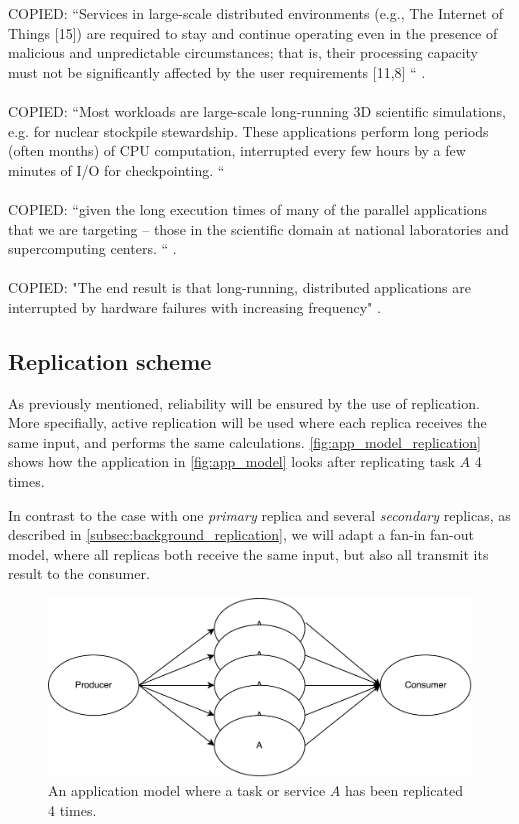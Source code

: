 \documentclass{cslthse-msc}
\begin{document}
COPIED:
“Services in large-scale distributed environments (e.g., The Internet of Things [15]) are required to stay and continue operating even in the presence of malicious and unpredictable circumstances; that is, their processing capacity must not be significantly affected by the user requirements [11,8] “ \cite{imprRelAdaptRL}.
\\\\
COPIED: “Most workloads are large-scale long-running 3D scientific simulations, e.g. for nuclear stockpile stewardship. These applications perform long periods (often months) of CPU computation, interrupted every few hours by a few minutes of I/O for checkpointing. “  \cite{studyOfFailures}
\\\\
COPIED: “given the long execution times of many of the parallel applications that we are targeting – those in the scientific domain at national laboratories and supercomputing centers. “  \cite{implicationsOfFailures}. 
\\\\
COPIED: "The end result is that long-running, distributed applications are interrupted by hardware failures with increasing frequency"  \cite{surveyFaultParallel}.

\fi

\subsection{Replication scheme} \label{subsec:design_repl_scheme}
As previously mentioned, reliability will be ensured by the use of replication. More specifially, active replication will be used where each replica receives the same input, and performs the same calculations. \autoref{fig:app_model_replication} shows how the application in \autoref{fig:app_model} looks after replicating task $A$ 4 times.

In contrast to the case with one \emph{primary} replica and several \emph{secondary} replicas, as described in \autoref{subsec:background_replication}, we will adapt a fan-in fan-out model, where all replicas both receive the same input, but also all transmit its result to the consumer. %

\begin{figure}[!hbt]
\centering
\includegraphics[scale=0.5]{images/app_model_replication.pdf} 
\caption{An application model where a task or service $A$ has been replicated 4 times.}\label{fig:app_model_replication}
\end{figure}
\end{document}

